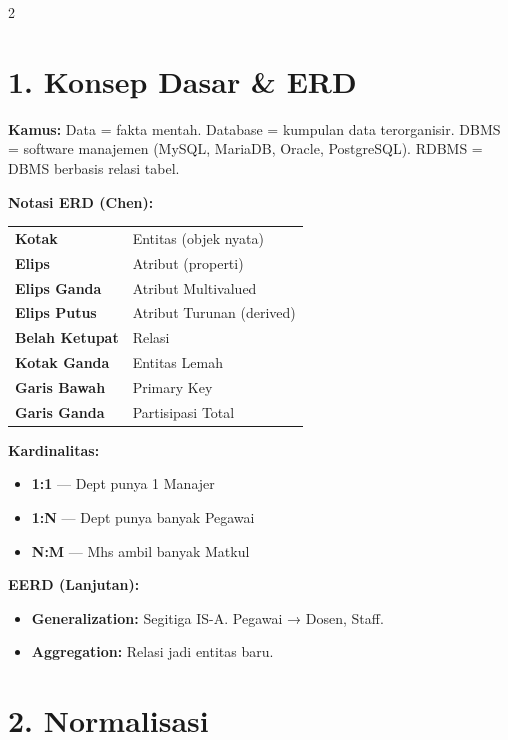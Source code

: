 \documentclass[10pt,a4paper]{article}
\begin{document}
\vspace{-1em}
\begin{multicols*}{2}

	\section*{1. Konsep Dasar \& ERD}

	\textbf{Kamus:} Data = fakta mentah. Database = kumpulan data terorganisir. DBMS = software manajemen (MySQL, MariaDB, Oracle, PostgreSQL). RDBMS = DBMS berbasis relasi tabel.

	\textbf{Notasi ERD (Chen):}
	\begin{tabularx}{\linewidth}{@{}l X@{}}
		\textbf{Kotak}         & Entitas (objek nyata)     \\
		\textbf{Elips}         & Atribut (properti)        \\
		\textbf{Elips Ganda}   & Atribut Multivalued       \\
		\textbf{Elips Putus}   & Atribut Turunan (derived) \\
		\textbf{Belah Ketupat} & Relasi                    \\
		\textbf{Kotak Ganda}   & Entitas Lemah             \\
		\textbf{Garis Bawah}   & Primary Key               \\
		\textbf{Garis Ganda}   & Partisipasi Total         \\
	\end{tabularx}

	\textbf{Kardinalitas:}
	\begin{itemize}
		\item \textbf{1:1} — Dept punya 1 Manajer
		\item \textbf{1:N} — Dept punya banyak Pegawai
		\item \textbf{N:M} — Mhs ambil banyak Matkul
	\end{itemize}

	\textbf{EERD (Lanjutan):}
	\begin{itemize}
		\item \textbf{Generalization:} Segitiga IS-A. Pegawai → Dosen, Staff.
		\item \textbf{Aggregation:} Relasi jadi entitas baru.
	\end{itemize}

	\section*{2. Normalisasi}


\end{multicols*}
\end{document}
